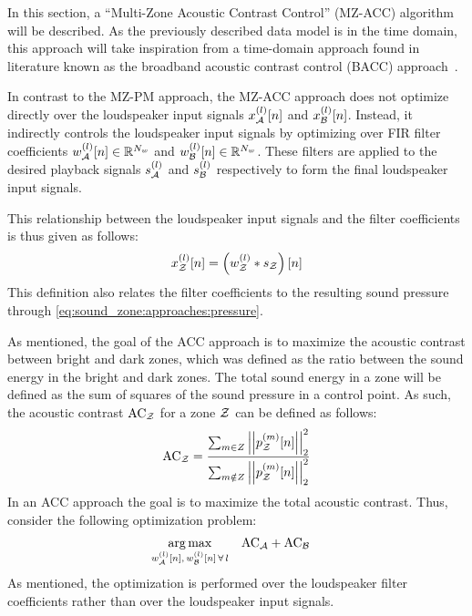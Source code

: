 In this section, a ``Multi-Zone Acoustic Contrast Control'' (MZ-ACC) algorithm will be described.
As the previously described data model is in the time domain, this approach will take inspiration from a time-domain approach found in literature known as the
broadband acoustic contrast control (BACC) approach~\cite{elliott2011regularisation, cai2014time, moller2016sound}.

In contrast to the MZ-PM approach, the MZ-ACC approach does not optimize directly over the loudspeaker input signals $x_{\mathcal{A}}^{(l)}[n]$ and $x_{\mathcal{B}}^{(l)}[n]$.
Instead, it indirectly controls the loudspeaker input signals by optimizing over 
FIR filter coefficients $w_{\mathcal{A}}^{(l)}[n]\in\mathbb{R}^{N_w}$ and $w_{\mathcal{B}}^{(l)}[n]\in\mathbb{R}^{N_w}$.
These filters are applied to the desired playback signals $s_{\mathcal{A}}^{(l)}$ and $s_{\mathcal{B}}^{(l)}$ respectively to form the final loudspeaker input signals.

This relationship between the loudspeaker input signals and the filter coefficients is thus given as follows:
\begin{equation}
    x_{\mathcal{Z}}^{(l)}[n] = \left(w_{\mathcal{Z}}^{(l)} \ast s_{\mathcal{Z}}\right)[n] 
\end{equation}
This definition also relates the filter coefficients to the resulting sound pressure through \autoref{eq:sound_zone:approaches:pressure}.

As mentioned, the goal of the ACC approach is to maximize the acoustic contrast between bright and dark zones,
which was defined as the ratio between the sound energy in the bright and dark zones.
The total sound energy in a zone will be defined as the sum of squares of the sound pressure in a control point.
As such, the acoustic contrast $\text{AC}_{\mathcal{Z}}$ for a zone $\mathcal{Z}$ can be defined as follows: 
\begin{equation}
    \text{AC}_{\zz} = \frac{\sum_{m\in Z} \norm[2][2]{p_\zz^{(m)}[n]}}{\sum_{m\notin Z} \norm[2][2]{p_\zz^{(m)}[n]}} 
\end{equation}
In an ACC approach the goal is to maximize the total acoustic contrast.
Thus, consider the following optimization problem:
\begin{align}
    \argmax{w_\za^{(l)}[n],\,w_\zb^{(l)}[n]\,\forall\,l}{
       &\text{AC}_\za + \text{AC}_\zb
    }
\end{align}
As mentioned, the optimization is performed over the loudspeaker filter coefficients rather than over the loudspeaker input signals.
